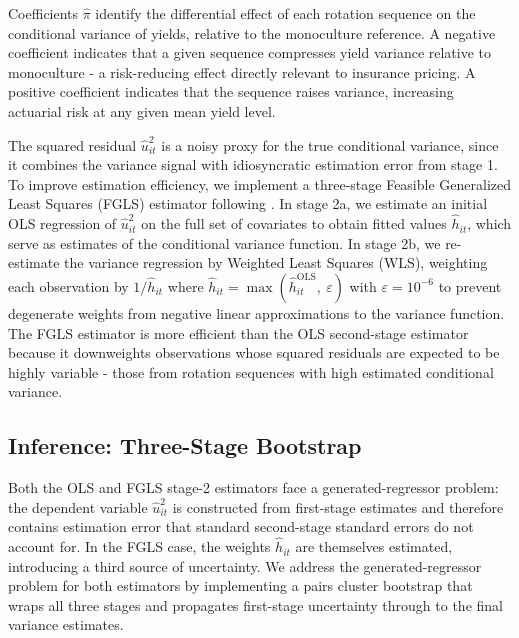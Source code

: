 \documentclass[12pt,letterpaper]{article}
\theoremstyle{remark}
\theoremstyle{remark}
\theoremstyle{plain}
\theoremstyle{definition}
\begin{document}
Coefficients $\hat{\pi}$ identify the differential effect of each rotation sequence on the conditional variance of yields, relative to the monoculture reference. A negative coefficient indicates that a given sequence compresses yield variance relative to monoculture - a risk-reducing effect directly relevant to insurance pricing. A positive coefficient indicates that the sequence raises variance, increasing actuarial risk at any given mean yield level.

The squared residual $\hat{u}_{it}^2$ is a noisy proxy for the true conditional variance, since it combines the variance signal with idiosyncratic estimation error from stage 1. To improve estimation efficiency, we implement a three-stage Feasible Generalized Least Squares (FGLS) estimator following \cite{Harvey1976}. In stage 2a, we estimate an initial OLS regression of $\hat{u}_{it}^2$ on the full set of covariates to obtain fitted values $\hat{h}_{it}$, which serve as estimates of the conditional variance function. In stage 2b, we re-estimate the variance regression by Weighted Least Squares (WLS), weighting each observation by $1/\hat{h}_{it}$ where $\hat{h}_{it}= \max(\hat{h}_{it}^{\text{OLS}},\ \varepsilon)$ with $\varepsilon = 10^{-6}$ to prevent degenerate weights from negative linear approximations to the variance function. The FGLS estimator is more efficient than the OLS second-stage estimator because it downweights observations whose squared residuals are expected to be highly variable - those from rotation sequences with high estimated conditional variance.

\subsection{\label{subsec:bootstrap}Inference: Three-Stage Bootstrap}

Both the OLS and FGLS stage-2 estimators face a generated-regressor problem: the dependent variable $\hat{u}_{it}^2$ is constructed from first-stage estimates and therefore contains estimation error that standard second-stage standard errors do not account for. In the FGLS case, the weights $\hat{h}_{it}$ are themselves estimated, introducing a third source of uncertainty. We address the generated-regressor problem for both estimators by implementing a pairs cluster bootstrap that wraps all three stages and propagates first-stage uncertainty through to the final variance estimates.
\end{document}
